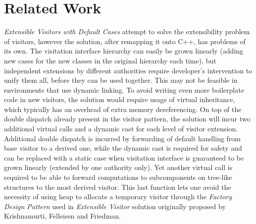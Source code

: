 \documentclass[preprint]{sigplanconf}
\begin{document}
\section{Related Work} %
\label{sec:rw}

\emph{Extensible Visitors with Default Cases}\cite[]{Zenger:2001} attempt to solve the extensibility problem of visitors, 
however the solution, after 
remapping it onto C++, has problems of its own. The visitation interface 
hierarchy can easily be grown linearly (adding new cases for the new classes in 
the original hierarchy each time), but independent extensions by different  
authorities require developer's intervention to unify them all, before they can 
be used together. This may not be feasible in environments that use dynamic 
linking. To avoid writing even more boilerplate code in new visitors, the 
solution would require usage of virtual inheritance, which typically has 
an overhead of extra memory dereferencing. On top of the double dispatch already 
present in the visitor pattern, the solution will incur two additional virtual 
calls and a dynamic cast for each level of visitor extension. Additional double 
dispatch is incurred by forwarding of default handling from base visitor to a 
derived one, while the dynamic cast is required for safety and can be replaced 
with a static case when visitation interface is guaranteed to be grown linearly 
(extended by one authority only). Yet another virtual call is required to be 
able to forward computations to subcomponents on tree-like structures to the 
most derived visitor. This last function lets one avoid the necessity of using 
heap to allocate a temporary visitor through the \emph{Factory Design 
Pattern}\cite{DesignPatterns1993} used in \emph{Extensible Visitor} solution 
originally proposed by Krishnamurti, Felleisen and Friedman\cite{Krishnamurthi98}.
\end{document}
